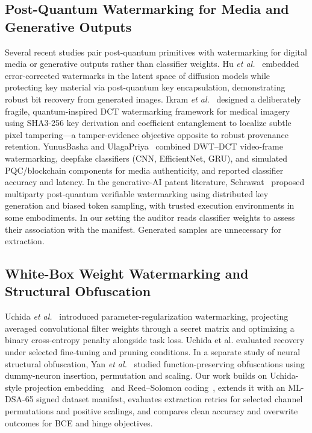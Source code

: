 \subsection{Post-Quantum Watermarking for Media and Generative Outputs}
Several recent studies pair post-quantum primitives with watermarking for digital media or generative outputs rather than classifier weights. Hu \emph{et al.}~\cite{hu2026diffusion} embedded error-corrected watermarks in the latent space of diffusion models while protecting key material via post-quantum key encapsulation, demonstrating robust bit recovery from generated images. Ikram \emph{et al.}~\cite{ikram2026medical} designed a deliberately fragile, quantum-inspired DCT watermarking framework for medical imagery using SHA3-256 key derivation and coefficient entanglement to localize subtle pixel tampering---a tamper-evidence objective opposite to robust provenance retention. YunusBasha and UlagaPriya~\cite{yunusbasha2026deepfake} combined DWT--DCT video-frame watermarking, deepfake classifiers (CNN, EfficientNet, GRU), and simulated PQC/blockchain components for media authenticity, and reported classifier accuracy and latency. In the generative-AI patent literature, Sehrawat~\cite{sehrawat2026patent} proposed multiparty post-quantum verifiable watermarking using distributed key generation and biased token sampling, with trusted execution environments in some embodiments. In our setting the auditor reads classifier weights to assess their association with the manifest. Generated samples are unnecessary for extraction.

\subsection{White-Box Weight Watermarking and Structural Obfuscation}
Uchida \emph{et al.}~\cite{uchida2017embedding} introduced parameter-regularization watermarking, projecting averaged convolutional filter weights through a secret matrix and optimizing a binary cross-entropy penalty alongside task loss. Uchida et al. evaluated recovery under selected fine-tuning and pruning conditions. In a separate study of neural structural obfuscation, Yan \emph{et al.}~\cite{yan2023rethinking} studied function-preserving obfuscations using dummy-neuron insertion, permutation and scaling. Our work builds on Uchida-style projection embedding~\cite{uchida2017embedding} and Reed--Solomon coding~\cite{reed1960polynomial}, extends it with an ML-DSA-65 signed dataset manifest, evaluates extraction retries for selected channel permutations and positive scalings, and compares clean accuracy and overwrite outcomes for BCE and hinge objectives.

